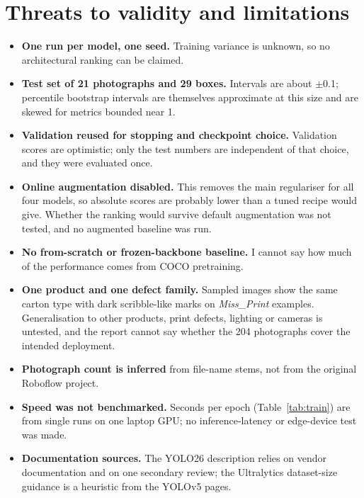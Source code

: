 \documentclass[11pt,a4paper]{article}
\begin{document}
\section{Threats to validity and limitations}\label{sec:limits}
\begin{itemize}[leftmargin=1.4em,itemsep=2pt]
  \item \textbf{One run per model, one seed.} Training variance is unknown, so no architectural ranking can be claimed.
  \item \textbf{Test set of 21 photographs and 29 boxes.} Intervals are about $\pm$0.1; percentile bootstrap intervals are themselves approximate at this size and are skewed for metrics bounded near 1.
  \item \textbf{Validation reused for stopping and checkpoint choice.} Validation scores are optimistic; only the test numbers are independent of that choice, and they were evaluated once.
  \item \textbf{Online augmentation disabled.} This removes the main regulariser for all four models, so absolute scores are probably lower than a tuned recipe would give. Whether the ranking would survive default augmentation was not tested, and no augmented baseline was run.
  \item \textbf{No from-scratch or frozen-backbone baseline.} I cannot say how much of the performance comes from COCO pretraining.
  \item \textbf{One product and one defect family.} Sampled images show the same carton type with dark scribble-like marks on \emph{Miss\_Print} examples. Generalisation to other products, print defects, lighting or cameras is untested, and the report cannot say whether the 204 photographs cover the intended deployment.
  \item \textbf{Photograph count is inferred} from file-name stems, not from the original Roboflow project.
  \item \textbf{Speed was not benchmarked.} Seconds per epoch (Table~\ref{tab:train}) are from single runs on one laptop GPU; no inference-latency or edge-device test was made.
  \item \textbf{Documentation sources.} The YOLO26 description relies on vendor documentation and on one secondary review; the Ultralytics dataset-size guidance is a heuristic from the YOLOv5 pages.
\end{itemize}
\end{document}
